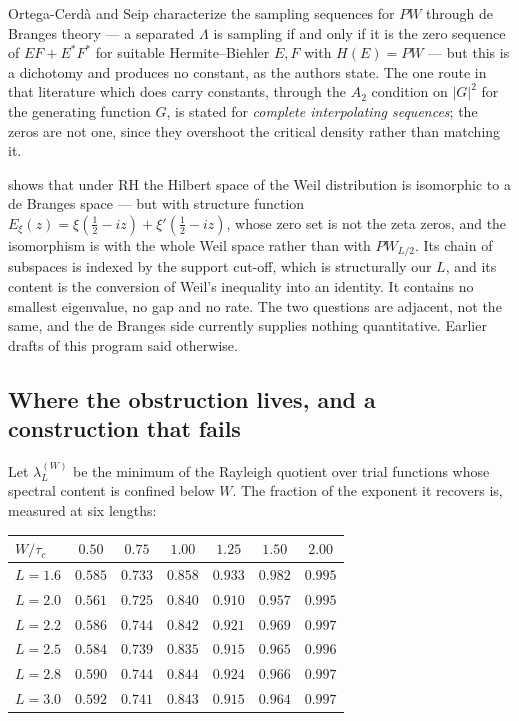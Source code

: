 Ortega-Cerd\`a and Seip \cite{OrtegaCerdaSeip} characterize the sampling sequences
for $PW$ through de Branges theory --- a separated $\Lambda$ is sampling if and
only if it is the zero sequence of $EF+E^*F^*$ for suitable Hermite--Biehler
$E,F$ with $H(E)=PW$ --- but this is a dichotomy and produces no constant, as the
authors state. The one route in that literature which does carry constants, through
the $A_2$ condition on $|G|^2$ for the generating function $G$, is stated for
\emph{complete interpolating sequences}; the zeros are not one, since they
overshoot the critical density rather than matching it.

\begin{remark}\label{rem:suzuki}
\cite{SuzukiDeBranges} shows that under RH the Hilbert space of the Weil
distribution is isomorphic to a de Branges space --- but with structure function
$E_\xi(z)=\xi(\frac12-iz)+\xi'(\frac12-iz)$, whose zero set is not the zeta zeros,
and the isomorphism is with the whole Weil space rather than with $PW_{L/2}$. Its
chain of subspaces is indexed by the support cut-off, which is structurally our
$L$, and its content is the conversion of Weil's inequality into an identity. It
contains no smallest eigenvalue, no gap and no rate. The two questions are
adjacent, not the same, and the de Branges side currently supplies nothing
quantitative. Earlier drafts of this program said otherwise.
\end{remark}

\subsection{Where the obstruction lives, and a construction that fails}
\label{subsec:profile}

Let $\lambda^{(W)}_L$ be the minimum of the Rayleigh quotient over trial functions
whose spectral content is confined below $W$. The fraction of the exponent it
recovers is, measured at six lengths:

\begin{center}
\begin{tabular}{@{}lcccccc@{}}
\toprule
$W/\tau_c$ & $0.50$ & $0.75$ & $1.00$ & $1.25$ & $1.50$ & $2.00$\\
\midrule
$L=1.6$ & $0.585$ & $0.733$ & $0.858$ & $0.933$ & $0.982$ & $0.995$\\
$L=2.0$ & $0.561$ & $0.725$ & $0.840$ & $0.910$ & $0.957$ & $0.995$\\
$L=2.2$ & $0.586$ & $0.744$ & $0.842$ & $0.921$ & $0.969$ & $0.997$\\
$L=2.5$ & $0.584$ & $0.739$ & $0.835$ & $0.915$ & $0.965$ & $0.996$\\
$L=2.8$ & $0.590$ & $0.744$ & $0.844$ & $0.924$ & $0.966$ & $0.997$\\
$L=3.0$ & $0.592$ & $0.741$ & $0.843$ & $0.915$ & $0.964$ & $0.997$\\
\bottomrule
\end{tabular}
\end{center}

